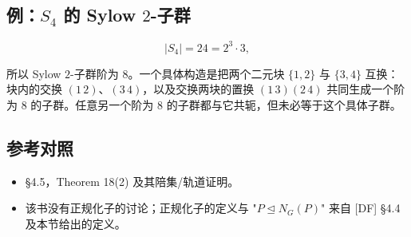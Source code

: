 \subsection{例：$S_4$ 的 Sylow $2$-子群}


\[
|S_4|=24=2^3\cdot3,
\]

所以 Sylow $2$-子群阶为 $8$。一个具体构造是把两个二元块 $\{1,2\}$ 与 $\{3,4\}$ 互换：块内的交换 $(1\,2)$、$(3\,4)$，以及交换两块的置换 $(1\,3)(2\,4)$ 共同生成一个阶为 $8$ 的子群。任意另一个阶为 $8$ 的子群都与它共轭，但未必等于这个具体子群。

\subsection{参考对照}


\begin{itemize}
\item [DF] §4.5，Theorem 18(2) 及其陪集/轨道证明。
\item [DS] 该书没有正规化子的讨论；正规化子的定义与 "$P\trianglelefteq N_G(P)$" 来自 [DF] §4.4 及本节给出的定义。
\end{itemize}
